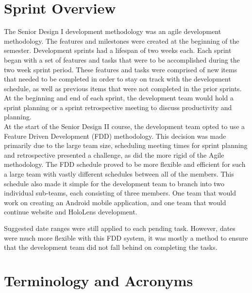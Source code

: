 \section{Sprint  Overview}
The Senior Design I development methodology was an agile development methodology.
The features and milestones were created at the beginning of the semester.
Development sprints had a lifespan of two weeks each.
Each sprint began with a set of features and tasks that were to be accomplished during the two week sprint period.
These features and tasks were comprised of new items that needed to be completed in order to stay on track with the development schedule, as well as previous items that were not completed in the prior sprints.
At the beginning and end of each sprint, the development team would hold a sprint planning or a sprint retrospective meeting to discuss productivity and planning.\\

At the start of the Senior Design II course, the development team opted to use a Feature Driven Development (FDD) methodology.  
This decision was made primarily due to the large team size, scheduling meeting times for sprint planning and retrospective presented a challenge, as did the more rigid of the Agile methodology. 
The FDD schedule proved to be more flexible and efficient for such a large team with vastly different schedules between all of the members.  
This schedule also made it simple for the development team to branch into two individual sub-teams, each consisting of three members.  
One team that would work on creating an Android mobile application, and one team that would continue website and HoloLens development.

Suggested date ranges were still applied to each pending task. However, dates were much more flexible with this FDD system, it was mostly a method to ensure that the development team did not fall behind on completing the tasks.


\section{Terminology and Acronyms}

